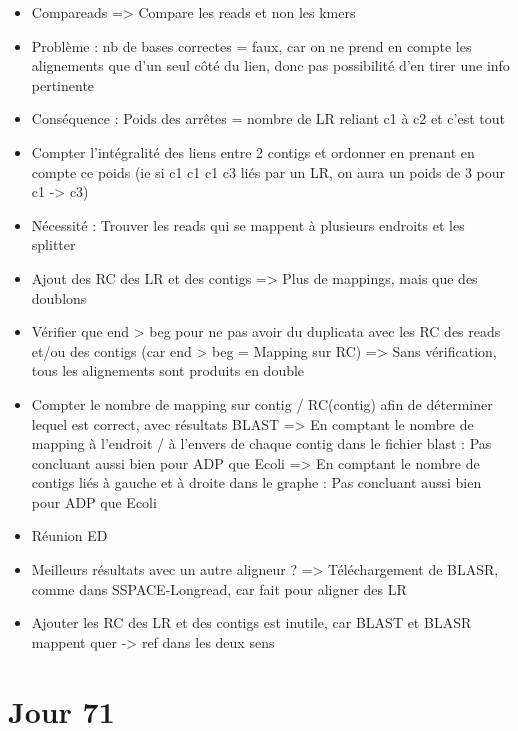 \documentclass[12pt]{report}
\begin{document}
\begin{itemize}
	\item Compareads => Compare les reads et non les kmers

	\item Problème : nb de bases correctes = faux, car on ne prend en compte les alignements que d'un seul côté du lien,
		  donc pas possibilité d'en tirer une info pertinente
	
	\item Conséquence : Poids des arrêtes = nombre de LR reliant c1 à c2 et c'est tout

	\item Compter l'intégralité des liens entre 2 contigs et ordonner en prenant en compte ce poids
		  (ie si c1 c1 c1 c3 liés par un LR, on aura un poids de 3 pour c1 -> c3)
	
	\item Nécessité : Trouver les reads qui se mappent à plusieurs endroits et les splitter
	
	\item Ajout des RC des LR et des contigs => Plus de mappings, mais que des doublons
	
	\item Vérifier que end > beg pour ne pas avoir du duplicata avec les RC des reads et/ou des contigs 
		  (car end > beg = Mapping sur RC) => Sans vérification, tous les alignements sont produits en double
	
	\item Compter le nombre de mapping sur contig / RC(contig) afin de déterminer lequel est correct, avec résultats BLAST
		  => En comptant le nombre de mapping à l'endroit / à l'envers de chaque contig dans le fichier blast : Pas concluant aussi bien pour ADP que Ecoli
		  => En comptant le nombre de contigs liés à gauche et à droite dans le graphe : Pas concluant aussi bien pour ADP que Ecoli
		  
	\item Réunion ED
	
	\item Meilleurs résultats avec un autre aligneur ? => Téléchargement de BLASR, comme dans SSPACE-Longread, car fait pour aligner des LR
	
	\item Ajouter les RC des LR et des contigs est inutile, car BLAST et BLASR mappent quer -> ref dans les deux sens
\end{itemize}

\section{Jour 71}
\end{document}
